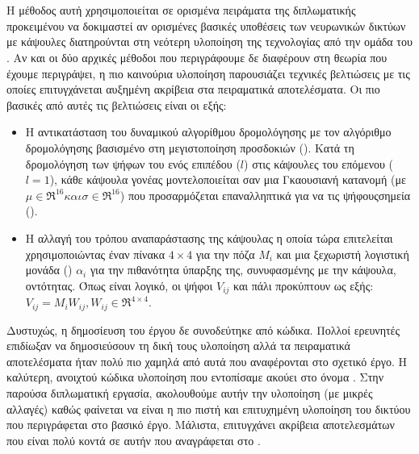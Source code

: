 \section{}

Η μέθοδος αυτή χρησιμοποιείται σε ορισμένα πειράματα της διπλωματικής προκειμένου να δοκιμαστεί αν ορισμένες βασικές υποθέσεις των νευρωνικών δικτύων με κάψουλες διατηρούνται στη νεότερη υλοποίηση της τεχνολογίας από την ομάδα του . Αν και οι δύο αρχικές μέθοδοι που περιγράφουμε δε διαφέρουν στη θεωρία που έχουμε περιγράψει, η πιο καινούρια υλοποίηση παρουσιάζει τεχνικές βελτιώσεις με τις οποίες επιτυγχάνεται αυξημένη ακρίβεια στα πειραματικά αποτελέσματα. Οι πιο βασικές από αυτές τις βελτιώσεις είναι οι εξής:
\begin{itemize}
  \item Η αντικατάσταση του δυναμικού αλγορίθμου δρομολόγησης με τον αλγόριθμο δρομολόγησης βασισμένο στη μεγιστοποίηση προσδοκιών (). Κατά τη δρομολόγηση των ψήφων του ενός επιπέδου ($l$) στις κάψουλες του επόμενου ($l=1$), κάθε κάψουλα γονέας μοντελοποιείται σαν μια Γκαουσιανή κατανομή (με $\mu \in \Re^{16} και \sigma \in \Re^{16}$) που προσαρμόζεται επαναλληπτικά για να  τις ψήφους\textendash σημεία ().
  \item Η αλλαγή του τρόπου αναπαράστασης της κάψουλας η οποία τώρα επιτελείται χρησιμοποιώντας έναν πίνακα $4\times 4$ για την πόζα $M_i$ και μια ξεχωριστή λογιστική μονάδα () $\alpha_i$ για την πιθανότητα ύπαρξης της, συνυφασμένης με την κάψουλα, οντότητας. Όπως είναι λογικό, οι ψήφοι $V_{ij}$ και πάλι προκύπτουν ως εξής: $V_{ij} = M_iW_{ij}, W_{ij} \in \Re^{4\times 4}$.
\end{itemize}

Δυστυχώς, η δημοσίευση του έργου \cite{hinton2018matrix} δε συνοδεύτηκε από κώδικα. Πολλοί ερευνητές επιδίωξαν να δημοσιεύσουν τη δική τους υλοποίηση αλλά τα πειραματικά αποτελέσματα ήταν πολύ πιο χαμηλά από αυτά που αναφέρονται στο σχετικό έργο. Η καλύτερη, ανοιχτού κώδικα υλοποίηση που εντοπίσαμε ακούει στο όνομα  \cite{gritzman2019avoiding}. Στην παρούσα διπλωματική εργασία, ακολουθούμε αυτήν την υλοποίηση (με μικρές αλλαγές) καθώς φαίνεται να είναι η πιο πιστή και επιτυχημένη υλοποίηση του δικτύου που περιγράφεται στο βασικό έργο. Μάλιστα, επιτυγχάνει ακρίβεια αποτελεσμάτων που είναι πολύ κοντά σε αυτήν που αναγράφεται στο \cite{hinton2018matrix}.\par

